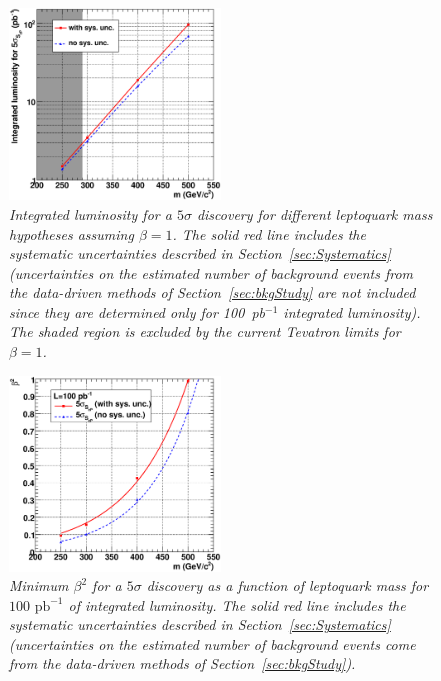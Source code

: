 \begin{figure}[h!]
 \centering
  \includegraphics[width=0.5\textwidth]{plots/cmsPotential/L5sigma_vs_m_log.eps}
 \caption{\small \sl Integrated luminosity for a $5\sigma$ discovery for different leptoquark mass hypotheses assuming $\beta=1$. 
The solid red line includes the systematic uncertainties described in Section~\ref{sec:Systematics} 
(uncertainties on the estimated number of background events from the data-driven methods
of Section~\ref{sec:bkgStudy} are not included since they are determined only for 100~pb$^{-1}$ integrated luminosity). 
The shaded region is excluded by the current Tevatron limits for $\beta=1$.\label{fig:discovery}}
\end{figure}
\begin{figure}[h!]
 \centering
  \includegraphics[width=0.5\textwidth]{plots/cmsPotential/beta2_vs_m.eps}
 \caption{\small \sl Minimum $\beta^2$ for
a $5\sigma$ discovery as a function of leptoquark mass for $100\text{ pb}^{-1}$ of integrated luminosity. The solid red line includes the systematic
uncertainties described in Section~\ref{sec:Systematics} 
(uncertainties on the estimated number of background events come from the data-driven methods of Section~\ref{sec:bkgStudy}).
\label{fig:discovery_beta}}
\end{figure}


